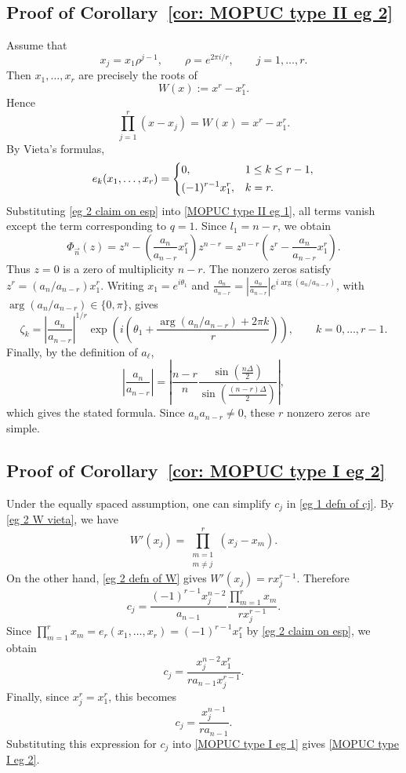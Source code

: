 \documentclass[a4paper,10pt,leqno]{amsart}
\numberwithin{equation}{section}
\theoremstyle{remark}
\begin{document}

\subsection{Proof of Corollary~\ref{cor: MOPUC type II eg 2}}

Assume that
\begin{equation} \label{eg 2 assumption}
x_j=x_1\rho^{j-1}, \qquad \rho=e^{2\pi i/r}, \qquad j=1,\ldots,r.
\end{equation}
Then \(x_1,\ldots,x_r\) are precisely the roots of
\begin{equation} \label{eg 2 defn of W}
W(x):=x^r-x_1^r.
\end{equation}
Hence
\begin{equation} \label{eg 2 W vieta}
\prod_{j=1}^r (x-x_j)=W(x)=x^r-x_1^r.
\end{equation}
By Vieta's formulas,
\begin{equation} \label{eg 2 claim on esp}
e_k(x_1,\ldots,x_r)=\begin{dcases} 0, & 1\leq k\leq r-1,\\ (-1)^{r-1}x_1^r, & k=r. \end{dcases}
\end{equation}
Substituting \eqref{eg 2 claim on esp} into \eqref{MOPUC type II eg 1}, all terms vanish except the term corresponding to \(q=1\). Since \(l_1=n-r\), we obtain
\[
\Phi_{\vec n}(z)=z^n-\left(\frac{a_n}{a_{n-r}}x_1^r\right)z^{n-r}=z^{n-r}\left(z^r-\frac{a_n}{a_{n-r}}x_1^r\right).
\]
Thus \(z=0\) is a zero of multiplicity \(n-r\). The nonzero zeros satisfy \(z^r=(a_n/a_{n-r})x_1^r\). Writing \(x_1=e^{i\theta_1}\) and \(\frac{a_n}{a_{n-r}}=\left|\frac{a_n}{a_{n-r}}\right|e^{i\arg(a_n/a_{n-r})}\), with \(\arg(a_n/a_{n-r})\in\{0,\pi\}\), gives
\[
\zeta_k=\left|\frac{a_n}{a_{n-r}}\right|^{1/r}\exp\left(i\left(\theta_1+\frac{\arg(a_n/a_{n-r})+2\pi k}{r}\right)\right), \qquad k=0,\ldots,r-1.
\]
Finally, by the definition of \(a_\ell\),
\[
\left|\frac{a_n}{a_{n-r}}\right|=\left|\frac{n-r}{n}\frac{\sin\left(\frac{n\Delta}{2}\right)}{\sin\left(\frac{(n-r)\Delta}{2}\right)}\right|,
\]
which gives the stated formula. Since \(a_n a_{n-r}\neq 0\), these \(r\) nonzero zeros are simple.
\subsection{Proof of Corollary~\ref{cor: MOPUC type I eg 2}}

Under the equally spaced assumption, one can simplify \(c_j\) in \eqref{eg 1 defn of cj}. By \eqref{eg 2 W vieta}, we have
\[
W'(x_j)=\prod_{\substack{m=1\\ m\neq j}}^r (x_j-x_m).
\]
On the other hand, \eqref{eg 2 defn of W} gives \(W'(x_j)=r x_j^{r-1}\). Therefore
\[
c_j=\frac{(-1)^{r-1}x_j^{n-2}}{a_{n-1}}\frac{\prod_{m=1}^r x_m}{r x_j^{r-1}}.
\]
Since \(\prod_{m=1}^r x_m=e_r(x_1,\ldots,x_r)=(-1)^{r-1}x_1^r\) by \eqref{eg 2 claim on esp}, we obtain
\[
c_j=\frac{x_j^{n-2}x_1^r}{r a_{n-1}x_j^{r-1}}.
\]
Finally, since \(x_j^r=x_1^r\), this becomes
\[
c_j=\frac{x_j^{n-1}}{r a_{n-1}}.
\]
Substituting this expression for \(c_j\) into \eqref{MOPUC type I eg 1} gives \eqref{MOPUC type I eg 2}.
\end{document}

